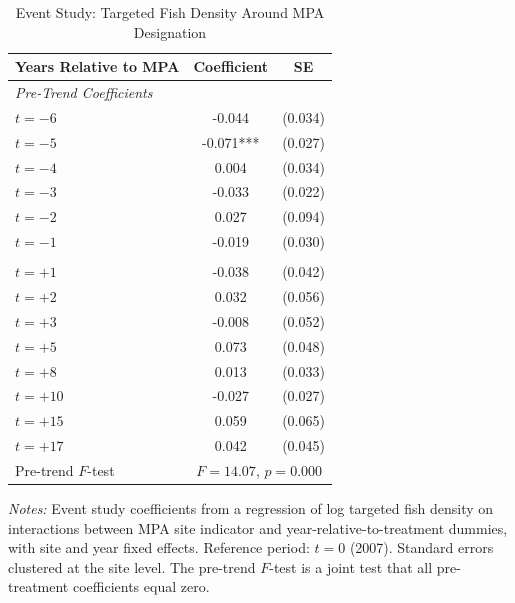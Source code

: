 \begin{table}[t]
\centering
\caption{Event Study: Targeted Fish Density Around MPA Designation}
\label{tab:eventstudy}
\begin{threeparttable}
\begin{tabular}{lcc}
\toprule
Years Relative to MPA & Coefficient & SE \\
\midrule
\multicolumn{3}{l}{\textit{Pre-Trend Coefficients}} \\
$t = -6$ & -0.044 & (0.034) \\
$t = -5$ & -0.071*** & (0.027) \\
$t = -4$ & 0.004 & (0.034) \\
$t = -3$ & -0.033 & (0.022) \\
$t = -2$ & 0.027 & (0.094) \\
$t = -1$ & -0.019 & (0.030) \\
\addlinespace
\multicolumn{3}{l}{\textit{Post-Treatment Coefficients (selected)}} \\
$t = +1$ & -0.038 & (0.042) \\
$t = +2$ & 0.032 & (0.056) \\
$t = +3$ & -0.008 & (0.052) \\
$t = +5$ & 0.073 & (0.048) \\
$t = +8$ & 0.013 & (0.033) \\
$t = +10$ & -0.027 & (0.027) \\
$t = +15$ & 0.059 & (0.065) \\
$t = +17$ & 0.042 & (0.045) \\
\midrule
Pre-trend $F$-test & \multicolumn{2}{c}{$F = 14.07$, $p = 0.000$} \\
\bottomrule
\end{tabular}
\begin{tablenotes}[flushleft]
\footnotesize
\item \textit{Notes:} Event study coefficients from a regression of log targeted fish density on interactions between MPA site indicator and year-relative-to-treatment dummies, with site and year fixed effects. Reference period: $t = 0$ (2007). Standard errors clustered at the site level. The pre-trend $F$-test is a joint test that all pre-treatment coefficients equal zero.
\end{tablenotes}
\end{threeparttable}
\end{table}
